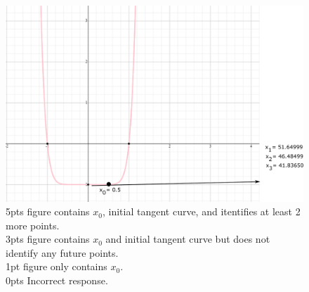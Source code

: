 \documentclass[11pt]{article}
\begin{document}
\begin{enumerate}[(c)]
	\begin{figure}[H]
		\centering
		\includegraphics[width = .7\textwidth]{1cplot}
		\caption*{\color{red} 5pts figure contains $x_0$, initial tangent curve, and itentifies at least 2 more points. \\
		3pts figure contains $x_0$ and initial tangent curve but does not identify any future points. \\
	    1pt figure only contains $x_0$. \\
        0pts Incorrect response.}
	
	
	\end{figure}
\end{enumerate}
 
\end{document}
